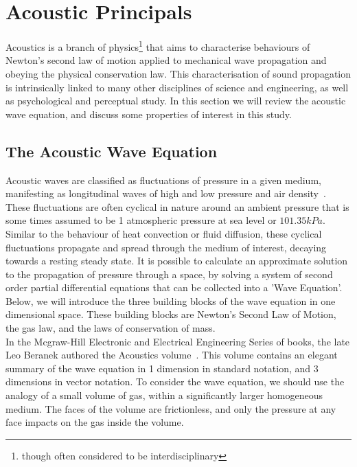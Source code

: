 %
%
%
\chapter{Acoustic Principals}
\label{Introduction}
Acoustics is a branch of physics\footnote{though often considered to be interdisciplinary} that aims to characterise behaviours of Newton's second law of motion applied to mechanical wave propagation and obeying the physical conservation law. This characterisation of sound propagation is intrinsically linked to many other disciplines of science and engineering, as well as psychological and perceptual study. In this section we will review the acoustic wave equation, and discuss some properties of interest in this study.

\section{The Acoustic Wave Equation}

Acoustic waves are classified as fluctuations of pressure in a given medium, manifesting as longitudinal waves of high and low pressure and air density~\cite{Rossing2007}. These fluctuations are often cyclical in nature around an ambient pressure that is some times assumed to be 1 atmospheric pressure at sea level or $101.35kPa$. Similar to the behaviour of heat convection or fluid diffusion, these cyclical fluctuations propagate and spread through the medium of interest, decaying towards a resting steady state. It is possible to calculate an approximate solution to the propagation of pressure through a space, by solving a system of second order partial differential equations that can be collected into a 'Wave Equation'. Below, we will introduce the three building blocks of the wave equation in one dimensional space. These building blocks are Newton's Second Law of Motion, the gas law, and the laws of conservation of mass.\\

In the Mcgraw-Hill Electronic and Electrical Engineering Series of books, the late Leo Beranek authored the Acoustics volume~\cite{beranek1954acoustics}. This volume contains an elegant summary of the wave equation in 1 dimension in standard notation, and 3 dimensions in vector notation. To consider the wave equation, we should use the analogy of a small volume of gas, within a significantly larger homogeneous medium. The faces of the volume are frictionless, and only the pressure at any face impacts on the gas inside the volume.\\

